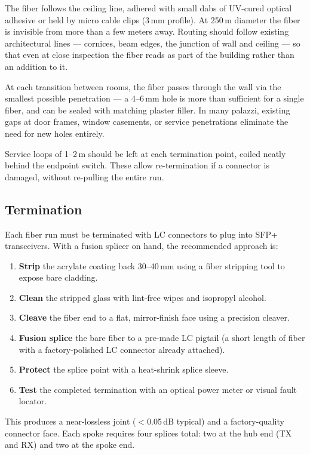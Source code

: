 \documentclass[10pt, letterpaper]{article}
\begin{document}
The fiber follows the ceiling line, adhered with small dabs of UV-cured optical adhesive or held by micro cable clips (3\,mm profile). At 250\,\textmu m diameter the fiber is invisible from more than a few meters away. Routing should follow existing architectural lines --- cornices, beam edges, the junction of wall and ceiling --- so that even at close inspection the fiber reads as part of the building rather than an addition to it.

At each transition between rooms, the fiber passes through the wall via the smallest possible penetration --- a 4--6\,mm hole is more than sufficient for a single fiber, and can be sealed with matching plaster filler. In many palazzi, existing gaps at door frames, window casements, or service penetrations eliminate the need for new holes entirely.

Service loops of 1--2\,m should be left at each termination point, coiled neatly behind the endpoint switch. These allow re-termination if a connector is damaged, without re-pulling the entire run.

\subsection{Termination}

Each fiber run must be terminated with LC connectors to plug into SFP+ transceivers. With a fusion splicer on hand, the recommended approach is:

\begin{enumerate}
  \item \textbf{Strip} the acrylate coating back 30--40\,mm using a fiber stripping tool to expose bare cladding.
  \item \textbf{Clean} the stripped glass with lint-free wipes and isopropyl alcohol.
  \item \textbf{Cleave} the fiber end to a flat, mirror-finish face using a precision cleaver.
  \item \textbf{Fusion splice} the bare fiber to a pre-made LC pigtail (a short length of fiber with a factory-polished LC connector already attached).
  \item \textbf{Protect} the splice point with a heat-shrink splice sleeve.
  \item \textbf{Test} the completed termination with an optical power meter or visual fault locator.
\end{enumerate}

This produces a near-lossless joint ($<$0.05\,dB typical) and a factory-quality connector face. Each spoke requires four splices total: two at the hub end (TX and RX) and two at the spoke end.
\end{document}
